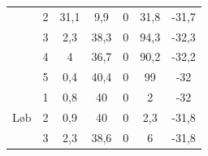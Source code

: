 \begin{table}[H]
{\begin{tabular}{ccccccc}
		& 2             & 31,1                                                                                                & 9,9                                                                                                & 0   & 31,8  & -31,7                                                                                                \\
		& 3             & 2,3                                                                                                  & 38,3                                                                                                & 0       & 94,3 & -32,3                                                                                            \\
		& 4             & 4                                                                                                & 36,7                                                                                              & 0      & 90,2& -32,2                                                                                               \\
		& 5             & 0,4                                                                                                & 40,4                                                                                                & 0      & 99 & -32                                                                                              \\ \hline
		\multirow{5}{*}{Løb}                                                      & 1                                                                                                          & 0,8 & 40                                                                                             & 0     & 2   & -32                                                                                             \\
		& 2                                                                                           & 0,9  & 40                                                                                            & 0         & 2,3 & -31,8                                                                                           \\
		& 3                                                                                              & 2,3    & 38,6                                                                                            & 0      & 6 & -31,8                                                                                              \\

\end{tabular}}
\end{table}
